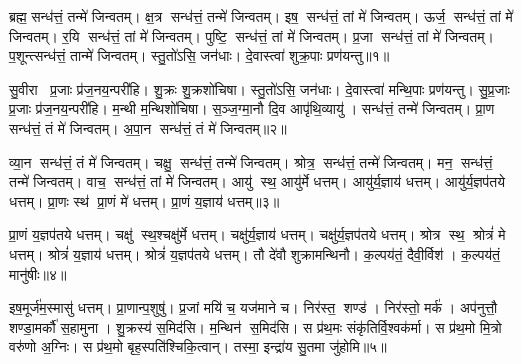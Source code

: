 



\setcounter{anuvakam}{0}
ब्रह्म॒ सन्ध॑त्तं॒ तन्मे॑ जिन्वतम्। क्ष॒त्र सन्ध॑त्तं॒ तन्मे॑ जिन्वतम्। इष॒ सन्ध॑त्तं॒ तां मे॑ जिन्वतम्। ऊर्ज॒ सन्ध॑त्तं॒ तां मे॑ जिन्वतम्। र॒यि सन्ध॑त्तं॒ तां मे॑ जिन्वतम्। पुष्टि॒ सन्ध॑त्तं॒ तां मे॑ जिन्वतम्। प्र॒जा सन्ध॑त्तं॒ तां मे॑ जिन्वतम्। प॒शून्त्सन्ध॑त्तं॒ तान्मे॑ जिन्वतम्। स्तु॒तो॑ऽसि॒ जन॑धाः। दे॒वास्त्वा॑ शुक्र॒पाः प्रण॑यन्तु॥१॥

सु॒वीरा प्र॒जाः प्र॑ज॒नय॒न्परी॑हि। शु॒क्रः शु॒क्रशो॑चिषा। स्तु॒तो॑ऽसि॒ जन॑धाः। दे॒वास्त्वा॑ मन्थि॒पाः प्रण॑यन्तु। सु॒प्र॒जाः प्र॒जाः प्र॑ज॒नय॒न्परी॑हि। म॒न्थी म॒न्थिशो॑चिषा। स॒ञ्ज॒ग्मा॒नौ दि॒व आपृ॑थि॒व्यायु॑। सन्ध॑त्तं॒ तन्मे॑ जिन्वतम्। प्रा॒ण सन्ध॑त्तं॒ तं मे॑ जिन्वतम्। अ॒पा॒न सन्ध॑त्तं॒ तं मे॑ जिन्वतम्॥२॥

व्या॒न सन्ध॑त्तं॒ तं मे॑ जिन्वतम्। चक्षु॒ सन्ध॑त्तं॒ तन्मे॑ जिन्वतम्। श्रोत्र॒ सन्ध॑त्तं॒ तन्मे॑ जिन्वतम्। मन॒ सन्ध॑त्तं॒ तन्मे॑ जिन्वतम्। वाच॒ सन्ध॑त्तं॒ तां मे॑ जिन्वतम्। आयु॑ स्थ॒ आयु॑र्मे धत्तम्। आयु॑र्य॒ज्ञाय॑ धत्तम्। आयु॑र्य॒ज्ञप॑तये धत्तम्। प्रा॒णः स्थ॑ प्रा॒णं मे॑ धत्तम्। प्रा॒णं य॒ज्ञाय॑ धत्तम्॥३॥

प्रा॒णं य॒ज्ञप॑तये धत्तम्। चक्षु॑ स्थ॒श्चक्षु॑र्मे धत्तम्। चक्षु॑र्य॒ज्ञाय॑ धत्तम्। चक्षु॑र्य॒ज्ञप॑तये धत्तम्। श्रोत्र स्थ॒ श्रोत्रं॑ मे धत्तम्। श्रोत्रं॑ य॒ज्ञाय॑ धत्तम्। श्रोत्रं॑ य॒ज्ञप॑तये धत्तम्। तौ दे॑वौ शुक्रामन्थिनौ। क॒ल्पय॑तं॒ दैवी॒र्विश॑। क॒ल्पय॑तं॒ मानु॑षीः॥४॥

इष॒मूर्ज॑म॒स्मासु॑ धत्तम्। प्रा॒णान्प॒शुषु॑। प्र॒जां मयि॑ च॒ यज॑माने च। निर॑स्त॒ शण्ड॑। निर॑स्तो॒ मर्क॑। अप॑नुत्तौ॒ शण्डा॒मर्कौ॑ स॒हामुना। शु॒क्रस्य॑ स॒मिद॑सि। म॒न्थिन॑ स॒मिद॑सि। स प्र॑थ॒मः संकृ॑तिर्वि॒श्वक॑र्मा। स प्र॑थ॒मो मि॒त्रो वरु॑णो अ॒ग्निः। स प्र॑थ॒मो बृह॒स्पति॑श्चिकि॒त्वान्। तस्मा॒ इन्द्रा॑य सु॒तमा जु॑होमि॥५॥\anuvakamend[न॒य॒न्त्व॒पा॒न सन्ध॑त्तं॒ तं मे॑ जिन्वतं प्रा॒णं य॒ज्ञाय॑ धत्तं॒ मानु॑षीर॒ग्निर्द्वे च॑॥ (ब्रह्म॑ क्ष॒त्रं तदिष॒मूर्ज र॒यिं पुष्टिं॑ प्र॒जां तां प॒शून्तान्त्सन्ध॑त्तं॒ तत्प्रा॒णम॑पा॒नं व्या॒नं तं चक्षु॒ श्रोत्रं॒ मन॒स्तद्वाचं॒ ताम्। इ॒षादि॒पञ्च॑के॒ वाचं॒ तां मे॑ प॒शून्त्सन्ध॑त्तं॒ तान्मे प्रा॒णादि॒त्रित॑ये॒ तं मे॒ऽन्यत्र॒ तन्मे)]

